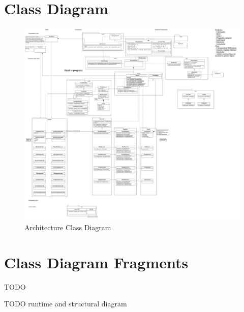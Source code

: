   \section{Class Diagram}
    \begin{figure}[H]
        \includegraphics[width = 1.2\linewidth]{diagrams/architecture_classes.png}
        \caption{Architecture Class Diagram}
        \label{fig:architecture_classes}
      \end{figure}

    \section{Class Diagram Fragments}
    TODO

TODO runtime and structural diagram

